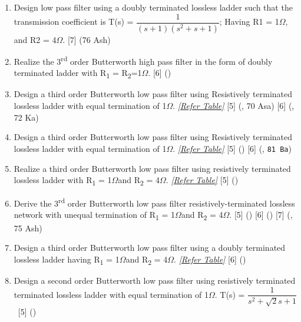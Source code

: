 \documentclass[12pt]{article}
\newcommand{\W}{\(\Omega\)}
\newcommand{\enter}{\\\textcolor{white}{1}}
\newcommand{\sub}[1]{\textsubscript{#1}}
\newcommand{\super}[1]{\textsuperscript{#1}}
\begin{document}
\begin{enumerate}
		\item Design low pass filter using a doubly terminated lossless ladder such that the transmission coefficient is T(s) = $\dfrac{1}{(s+1)(s^2+s+1)}$; Having R1 = 1\W, and R2 = 4\W. \hspace{2.1cm} [7] (76 Ash)
	
		\item Realize the 3\super{rd} order Butterworth high pass filter in the form of doubly terminated ladder with R\sub{1} = R\sub{2}=1\W. \hfill [6] ()
	
		\item Design a third order Butterworth low pass filter using Resistively terminated lossless ladder with equal termination of 1\W. \textit{[\hyperref[sec:tables_81ba]{Refer Table]}} \hfill [5] (, 70 Asa) [6] (, 72 Ka)
	
		\item Design a third order Butterworth low pass filter using Resistively terminated lossless ladder with equal termination of 1\W. \textit{[\hyperref[sec:tables_81ba]{Refer Table]}} \hfill [5] () [6] (, \texttt{81 Ba})
	
		\item Realize a third order Butterworth low pass filter using resistively terminated lossless ladder with R\sub{1} = 1\W and R\sub{2} = 4\W. \textit{[\hyperref[sec:tables_81bh]{Refer Table]}} \hfill [5] ()
	
		\item Derive the 3\super{rd} order Butterworth low pass filter resistively-terminated lossless network with unequal termination of R\sub{1} = 1\W and R\sub{2} = 4\W. \hfill [5] () [6] () [7] (, 75 Ash)

		\item Design a third order Butterworth low pass filter using a doubly terminated lossless ladder having R\sub{1} = 1\W and R\sub{2} = 4\W. \textit{[\hyperref[sec:tables_81bh]{Refer Table]}} \hfill [6] ()
	
		\item Design a second order Butterworth low pass filter using resistively terminated terminated lossless ladder with equal termination of 1\W. T(s) = $\dfrac{1}{s^2+\sqrt{2}s+1}$ 
	\enter\hfill [5] ()
\end{enumerate}
\end{document}
